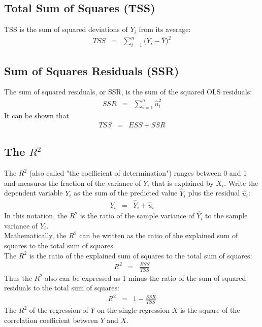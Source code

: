 \subsection{Total Sum of Squares (TSS)}
TSS is the sum of squared deviations of $Y_{i}$ from its average:
\begin{eqnarray}
 TSS &=& \sum_{i = 1}^{n}\big(Y_{i} - \bar{Y}\big)^{2}
\end{eqnarray}

\subsection{Sum of Squares Residuals (SSR)}
The sum of squared residuals, or SSR, is the sum of the squared OLS residuals:
\begin{eqnarray}
	SSR &=& \sum_{i = 1}^{n}\hat{u}_{i}^{2}
\end{eqnarray}
It can be shown that
\begin{eqnarray}
	TSS &=& ESS + SSR
\end{eqnarray}


\subsection{The \texorpdfstring{$R^{2}$}{R2}}
The $R^{2}$ (also called "the coefficient of determination") ranges between 0 and 1 and measures the fraction of the variance of $Y_{i}$ that is explained by $X_{i}$. Write the dependent variable $Y_{i}$ as the sum of the predicted value $\hat{Y}_{i}$ plus the residual $\hat{u}_{i}$:
\begin{eqnarray}
	Y_{i} &=& \hat{Y}_{i} + \hat{u}_{i}
\end{eqnarray}
In this notation, the $R^{2}$ is the ratio of the sample variance of $\hat{Y_{i}}$ to the sample variance of $Y_{i}$.\\
Mathematically, the $R^{2}$ can be written as the ratio of the explained sum of squares to the total sum of squares.\\
The $R^{2}$ is the ratio of the explained sum of squares to the total sum of squares:
\begin{eqnarray}
	R^{2} &=& \frac{ESS}{TSS}
\end{eqnarray}
Thus the $R^{2}$ also can be expressed as 1 minus the ratio of the sum of squared residuals to the total sum of squares:
\begin{eqnarray}
	R^{2} &=& 1 - \frac{SSR}{TSS}
\end{eqnarray}
The $R^{2}$ of the regression of $Y$ on the single regression $X$ is the square of the correlation coefficient between $Y$ and $X$.


